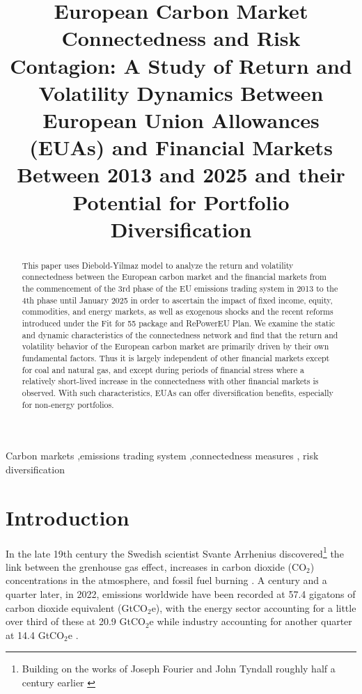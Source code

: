 \documentclass[preprint, 3p,
authoryear]{elsarticle} %
\begin{document}
\begin{frontmatter}

  \title{European Carbon Market Connectedness and Risk Contagion: A
Study of Return and Volatility Dynamics Between European Union
Allowances (EUAs) and Financial Markets Between 2013 and 2025 and their
Potential for Portfolio Diversification}
  
  \begin{abstract}
  This paper uses Diebold-Yilmaz model to analyze the return and
  volatility connectedness between the European carbon market and the
  financial markets from the commencement of the 3rd phase of the EU
  emissions trading system in 2013 to the 4th phase until January 2025
  in order to ascertain the impact of fixed income, equity, commodities,
  and energy markets, as well as exogenous shocks and the recent reforms
  introduced under the Fit for 55 package and RePowerEU Plan. We examine
  the static and dynamic characteristics of the connectedness network
  and find that the return and volatility behavior of the European
  carbon market are primarily driven by their own fundamental factors.
  Thus it is largely independent of other financial markets except for
  coal and natural gas, and except during periods of financial stress
  where a relatively short-lived increase in the connectedness with
  other financial markets is observed. With such characteristics, EUAs
  can offer diversification benefits, especially for non-energy
  portfolios.
  \end{abstract}
    \begin{keyword}
    Carbon markets \sep emissions trading system \sep connectedness
measures \sep 
    risk diversification
  \end{keyword}
  
 \end{frontmatter}

\hypertarget{introduction}{%
\section{Introduction}\label{introduction}}

In the late 19th century the Swedish scientist Svante Arrhenius
discovered\footnote{Building on the works of Joseph Fourier and John Tyndall roughly half a century earlier \citep{corfee-morlot_global_2007}}
the link between the grenhouse gas effect, increases in carbon dioxide
(CO\(_2\)) concentrations in the atmosphere, and fossil fuel burning
\citep{corfee-morlot_global_2007, hart_scientific_1993, weart_discovery_2008}.
A century and a quarter later, in 2022, emissions worldwide have been
recorded at 57.4 gigatons of carbon dioxide equivalent (GtCO\(_2\)e),
with the energy sector accounting for a little over third of these at
20.9 GtCO\(_2\)e while industry accounting for another quarter at 14.4
GtCO\(_2\)e \citep{unep_emissions_2023}.
\end{document}

